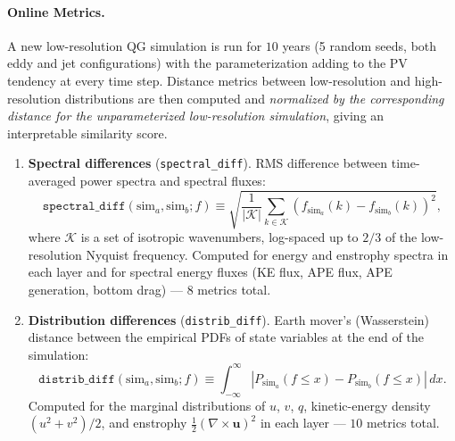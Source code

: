 \documentclass[../SQG_notes.tex]{subfiles}
\begin{document}
    \paragraph{Online Metrics.} A new low-resolution QG simulation is run for $10$ years (5 random seeds, both eddy and jet configurations) with the parameterization adding to the PV tendency at every time step. Distance metrics between low-resolution and high-resolution distributions are then computed and \emph{normalized by the corresponding distance for the unparameterized low-resolution simulation}, giving an interpretable similarity score.

    \begin{enumerate}
        \item \textbf{Spectral differences} (\texttt{spectral\_diff}). RMS difference between time-averaged power spectra and spectral fluxes:
        \begin{equation}
            \texttt{spectral\_diff}(\text{sim}_a, \text{sim}_b; f) \equiv \sqrt{\frac{1}{|\mathcal{K}|} \sum_{k \in \mathcal{K}} \left(f_{\text{sim}_a}(k) - f_{\text{sim}_b}(k)\right)^2},
        \end{equation}
        where $\mathcal{K}$ is a set of isotropic wavenumbers, log-spaced up to $2/3$ of the low-resolution Nyquist frequency. Computed for energy and enstrophy spectra in each layer and for spectral energy fluxes (KE flux, APE flux, APE generation, bottom drag) --- $8$ metrics total.

        \item \textbf{Distribution differences} (\texttt{distrib\_diff}). Earth mover's (Wasserstein) distance between the empirical PDFs of state variables at the end of the simulation:
        \begin{equation}
            \texttt{distrib\_diff}(\text{sim}_a, \text{sim}_b; f) \equiv \int_{-\infty}^{\infty} \left| P_{\text{sim}_a}(f \leq x) - P_{\text{sim}_b}(f \leq x) \right| \, dx.
        \end{equation}
        Computed for the marginal distributions of $u$, $v$, $q$, kinetic-energy density $(u^2 + v^2)/2$, and enstrophy $\frac{1}{2}(\nabla \times \mathbf{u})^2$ in each layer --- $10$ metrics total. 


\end{enumerate}
\end{document}
